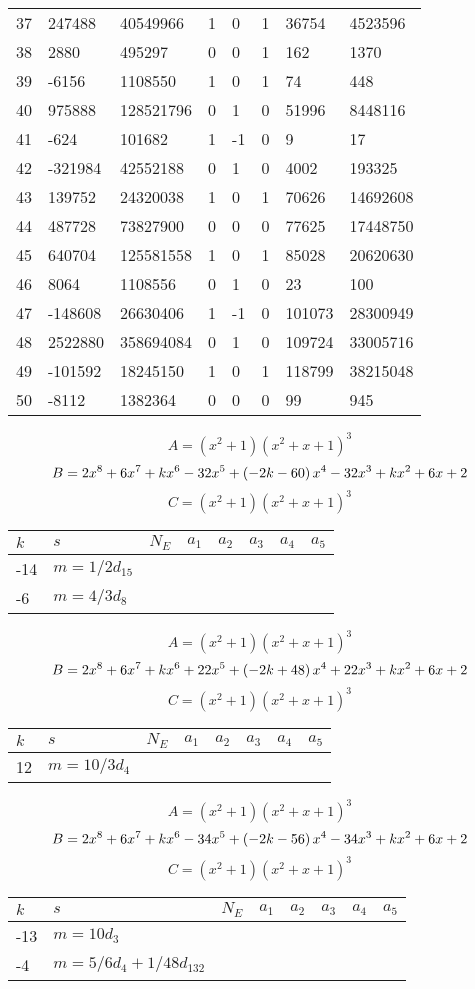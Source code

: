\documentclass{amsart}
\begin{document}
\begin{longtable}{|l|l|l|lllll|}
37&247488&40549966&1&0&1&36754&4523596\\
38&2880&495297&0&0&1&162&1370\\
39&-6156&1108550&1&0&1&74&448\\
40&975888&128521796&0&1&0&51996&8448116\\
41&-624&101682&1&-1&0&9&17\\
42&-321984&42552188&0&1&0&4002&193325\\
43&139752&24320038&1&0&1&70626&14692608\\
44&487728&73827900&0&0&0&77625&17448750\\
45&640704&125581558&1&0&1&85028&20620630\\
46&8064&1108556&0&1&0&23&100\\
47&-148608&26630406&1&-1&0&101073&28300949\\
48&2522880&358694084&0&1&0&109724&33005716\\
49&-101592&18245150&1&0&1&118799&38215048\\
50&-8112&1382364&0&0&0&99&945\\
\hline
\end{longtable}
$$A=(x^2
 + 1)(x^2
 + x
 + 1)^{3}$$
$$B=2\*x^8
 + 6\*x^7
 + k\*x^6
 - 32\*x^5
 + \left(-2\*k
 - 60\right) \*x^4
 - 32\*x^3
 + k\*x^2
 + 6\*x
 + 2$$
$$C=(x^2
 + 1)(x^2
 + x
 + 1)^{3}$$
\begin{longtable}{|l|l|l|lllll|}
\hline
$k$ & $s$ & $N_E$ & $a_1$ & $a_2$ & $a_3$ & $a_4$ & $a_5$\\
\hline
-14&$m=1/2d_{15}$&&\multicolumn{5}{c|}{}\\
-6&$m=4/3d_{8}$&&\multicolumn{5}{c|}{}\\
\hline
\end{longtable}
$$A=(x^2
 + 1)(x^2
 + x
 + 1)^{3}$$
$$B=2\*x^8
 + 6\*x^7
 + k\*x^6
 + 22\*x^5
 + \left(-2\*k
 + 48\right) \*x^4
 + 22\*x^3
 + k\*x^2
 + 6\*x
 + 2$$
$$C=(x^2
 + 1)(x^2
 + x
 + 1)^{3}$$
\begin{longtable}{|l|l|l|lllll|}
\hline
$k$ & $s$ & $N_E$ & $a_1$ & $a_2$ & $a_3$ & $a_4$ & $a_5$\\
\hline
12&$m=10/3d_{4}$&&\multicolumn{5}{c|}{}\\
\hline
\end{longtable}
$$A=(x^2
 + 1)(x^2
 + x
 + 1)^{3}$$
$$B=2\*x^8
 + 6\*x^7
 + k\*x^6
 - 34\*x^5
 + \left(-2\*k
 - 56\right) \*x^4
 - 34\*x^3
 + k\*x^2
 + 6\*x
 + 2$$
$$C=(x^2
 + 1)(x^2
 + x
 + 1)^{3}$$
\begin{longtable}{|l|l|l|lllll|}
\hline
$k$ & $s$ & $N_E$ & $a_1$ & $a_2$ & $a_3$ & $a_4$ & $a_5$\\
\hline
-13&$m=10d_{3}$&&\multicolumn{5}{c|}{}\\
-4&$m=5/6d_{4}+1/48d_{132}$&&\multicolumn{5}{c|}{}\\
\hline
\end{longtable}
\end{document}
